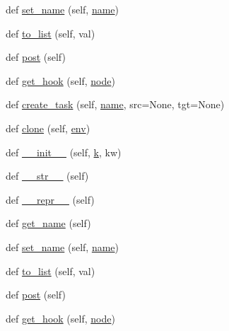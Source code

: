 \begin{DoxyCompactItemize}
\item 
def \hyperlink{classwaflib_1_1_task_gen_1_1task__gen_a79705c7a6b9b09021ee549e428c5a5c1}{set\+\_\+name} (self, \hyperlink{lib_2expat_8h_a1b49b495b59f9e73205b69ad1a2965b0}{name})
\item 
def \hyperlink{classwaflib_1_1_task_gen_1_1task__gen_a31a9f508654465cd5fe9f3baaaf77ec4}{to\+\_\+list} (self, val)
\item 
def \hyperlink{classwaflib_1_1_task_gen_1_1task__gen_aa00dedae17f7fa03c169f0e4bdab7414}{post} (self)
\item 
def \hyperlink{classwaflib_1_1_task_gen_1_1task__gen_a19b53157d4411479cf8f55e0ef0edfec}{get\+\_\+hook} (self, \hyperlink{structnode}{node})
\item 
def \hyperlink{classwaflib_1_1_task_gen_1_1task__gen_ad432ecefdf2362d1cccf1dad31fac2d3}{create\+\_\+task} (self, \hyperlink{lib_2expat_8h_a1b49b495b59f9e73205b69ad1a2965b0}{name}, src=None, tgt=None)
\item 
def \hyperlink{classwaflib_1_1_task_gen_1_1task__gen_a7b7e036b797a0532ce6be8df951ba048}{clone} (self, \hyperlink{classwaflib_1_1_task_gen_1_1task__gen_a4d6f968ce8718fdf77d46ea3b56def1e}{env})
\item 
def \hyperlink{classwaflib_1_1_task_gen_1_1task__gen_a17ba35bed2219481190d515ffef57404}{\+\_\+\+\_\+init\+\_\+\+\_\+} (self, \hyperlink{rfft2d_test_m_l_8m_adc468c70fb574ebd07287b38d0d0676d}{k}, kw)
\item 
def \hyperlink{classwaflib_1_1_task_gen_1_1task__gen_a48c763160308a6ff809b7048702618b1}{\+\_\+\+\_\+str\+\_\+\+\_\+} (self)
\item 
def \hyperlink{classwaflib_1_1_task_gen_1_1task__gen_a040db536e5d7fe5054c9e9da52f36eb0}{\+\_\+\+\_\+repr\+\_\+\+\_\+} (self)
\item 
def \hyperlink{classwaflib_1_1_task_gen_1_1task__gen_a50370e76b549fc3bd0369c35f4fc1bab}{get\+\_\+name} (self)
\item 
def \hyperlink{classwaflib_1_1_task_gen_1_1task__gen_a79705c7a6b9b09021ee549e428c5a5c1}{set\+\_\+name} (self, \hyperlink{lib_2expat_8h_a1b49b495b59f9e73205b69ad1a2965b0}{name})
\item 
def \hyperlink{classwaflib_1_1_task_gen_1_1task__gen_a31a9f508654465cd5fe9f3baaaf77ec4}{to\+\_\+list} (self, val)
\item 
def \hyperlink{classwaflib_1_1_task_gen_1_1task__gen_aa00dedae17f7fa03c169f0e4bdab7414}{post} (self)
\item 
def \hyperlink{classwaflib_1_1_task_gen_1_1task__gen_a19b53157d4411479cf8f55e0ef0edfec}{get\+\_\+hook} (self, \hyperlink{structnode}{node})

\end{DoxyCompactItemize}
